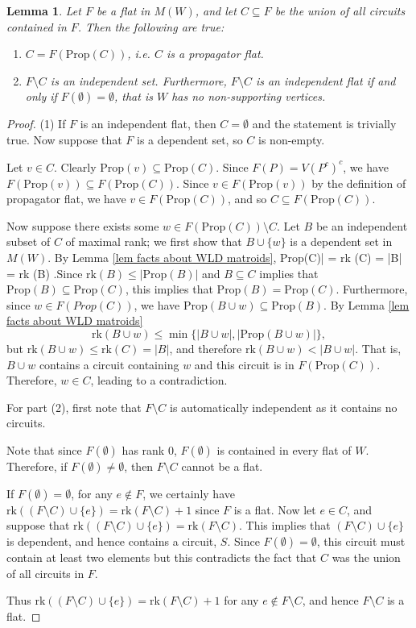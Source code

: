 \documentclass[11pt]{article}
\newcommand{\rk}{\textrm{rk} }
\def\bas #1\eas{\begin{align*} #1 \end{align*}}
\newcommand{\Prop}{\textrm{Prop}}
\newtheorem{lem}[thm]{Lemma}
\theoremstyle{remark}
\theoremstyle{definition}
\begin{document}
\begin{lem} \label{lem decompose flat}Let $F$ be a flat in $M(W)$, and let $C \subseteq F$ be the union of all circuits contained in $F$. Then the following are true:
\begin{enumerate}
\item $C = F(\Prop (C))$, i.e. $C$ is a propagator flat.
\item $F \setminus C$ is an independent set. Furthermore, $F\setminus C$ is an independent flat if and only if $F(\emptyset) = \emptyset$, that is $W$ has no non-supporting vertices.  
\end{enumerate}
\end{lem}

\begin{proof}
(1) If $F$ is an independent flat, then $C = \emptyset$ and the statement is trivially true. Now suppose that $F$ is a dependent set, so $C$ is non-empty.

Let $v \in C$. Clearly $\Prop(v) \subseteq \Prop(C)$. Since $F(P)  = V(P^c)^c$, we have $F(\Prop(v)) \subseteq F(\Prop(C))$. Since $v \in F(\Prop(v))$ by the definition of propagator flat, we have $v \in F(\Prop(C))$, and so $C \subseteq F(\Prop(C))$. 

Now suppose there exists some $w \in  F(\Prop(C)) \setminus C$. Let $B$ be an independent subset of $C$ of maximal rank; we first show that $B \cup \{w\}$ is a dependent set in $M(W)$. By Lemma \ref{lem facts about WLD matroids}, \bas |\Prop(C)| = \rk(C) = |B| = \rk(B) .\eas Since $\rk(B) \leq |\Prop(B)|$ and $B \subseteq C$ implies that  $\Prop(B) \subseteq \Prop(C)$, this implies that $\Prop(B) = \Prop(C)$. Furthermore, since $w \in F(Prop(C))$, we have $\Prop(B\cup w) \subseteq \Prop(B)$. By Lemma \ref{lem facts about WLD matroids}
\[
\rk (B \cup w) \leq \min\{|B\cup w|, |\Prop(B\cup w)|\},
\]
but $\rk (B\cup w) \leq \rk(C) = |B|$, and therefore $\rk (B \cup w) < |B\cup w|$. That is, $B\cup w$ contains a circuit containing $w$ and this circuit is in $F(\Prop(C))$. Therefore, $w \in C$, leading to a contradiction.


For part (2), first note that $F \setminus C$ is automatically independent as it contains no circuits.

Note that since $F(\emptyset)$ has rank $0$, $F(\emptyset)$ is contained in every flat of $W$. Therefore, if $F(\emptyset) \neq \emptyset$, then $F\setminus C$ cannot be a flat. 

If $F(\emptyset) = \emptyset$, for any $e \not\in F$, we certainly have $\rk((F\setminus C)\cup\{e\}) = \rk(F\setminus C) +1$ since $F$ is a flat. Now let $e \in C$, and suppose that $\rk((F\setminus C)\cup\{e\}) = \rk(F\setminus C)$. This implies that $(F\setminus C)\cup \{e\}$ is dependent, and hence contains a circuit, $S$. Since $F(\emptyset) = \emptyset$, this circuit must contain at least two elements but this contradicts the fact that $C$ was the union of all circuits in $F$. 

Thus $\rk((F\setminus C)\cup \{e\}) = \rk(F\setminus C) + 1$ for any $e \not\in F\setminus C$, and hence $F\setminus C$ is a flat.
\end{proof}
\end{document}
